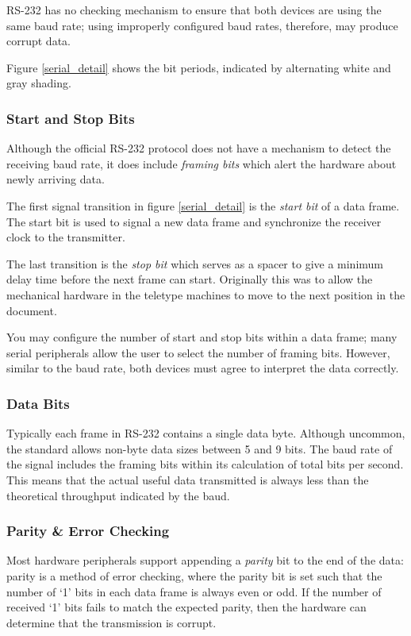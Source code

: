 \documentclass[openany,11pt,fleqn]{book} %
\begin{document}
RS-232 has no checking mechanism to ensure that both devices are using the same baud rate; using improperly configured baud rates, therefore, may produce corrupt data. 

Figure \ref{serial_detail} shows the bit periods, indicated by alternating white and gray shading. 

\subsubsection{Start and Stop Bits}
Although the official RS-232 protocol does not have a mechanism to detect the receiving baud rate, it does include \textit{framing bits} which alert the hardware about newly arriving data. 

The first signal transition in figure \ref{serial_detail} is the \textit{start bit} of a data frame. The start bit is used to signal a new data frame and synchronize the receiver clock to the transmitter.   

The last transition is the \textit{stop bit} which serves as a spacer to give a minimum delay time before the next frame can start. Originally this was to allow the mechanical hardware in the teletype machines to move to the next position in the document.

You may configure the number of start and stop bits within a data frame; many serial peripherals allow the user to select the number of framing bits. However, similar to the baud rate, both devices must agree to interpret the data correctly. 
 

\subsubsection{Data Bits} 
Typically each frame in RS-232 contains a single data byte. Although uncommon, the standard allows non-byte data sizes between 5 and 9 bits. The baud rate of the signal includes the framing bits within its calculation of total bits per second. This means that the actual useful data transmitted is always less than the theoretical throughput indicated by the baud. 

\subsubsection{Parity \& Error Checking}
Most hardware peripherals support appending a \textit{parity} bit to the end of the data: parity is a method of error checking, where the parity bit is set such that the number of `1' bits in each data frame is always even or odd. If the number of received `1' bits fails to match the expected parity, then the hardware can determine that the transmission is corrupt. 
\end{document}
